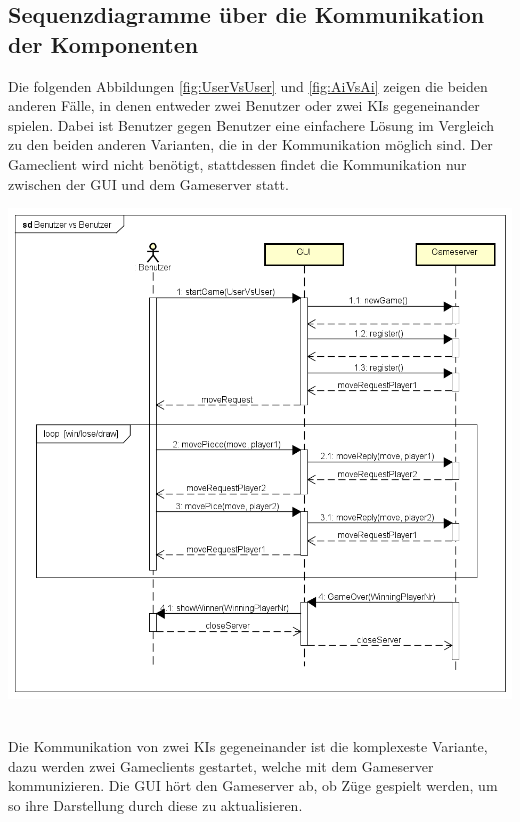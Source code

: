 \documentclass[12pt,a4paper,bibliography=totocnumbered,listof=totocnumbered]{article}
\begin{document}
\begin{appendix}
\pagebreak

\section{Sequenzdiagramme über die Kommunikation der Komponenten}
\label{apx:KommunikationDerKomp}
Die folgenden Abbildungen \ref{fig:UserVsUser} und \ref{fig:AiVsAi} zeigen die beiden anderen Fälle, in 
denen entweder zwei Benutzer oder zwei KIs gegeneinander spielen. Dabei ist Benutzer gegen Benutzer eine einfachere Lösung im Vergleich zu den beiden anderen Varianten, die 
in der Kommunikation möglich sind. Der Gameclient wird nicht benötigt, stattdessen findet die Kommunikation nur zwischen der \ac{GUI} und dem Gameserver statt.

\vspace{1em}
\begin{minipage}{\linewidth}
	\centering
	\includegraphics[width=1.0\linewidth]{pics/SequenceDiagramBenutzervsBenutzer.png}
    \label{fig:UserVsUser}
\end{minipage}
\\

Die Kommunikation von zwei KIs gegeneinander ist die komplexeste Variante, dazu werden zwei Gameclients gestartet, welche mit dem Gameserver 
kommunizieren. Die \ac{GUI} hört den Gameserver ab, ob Züge gespielt werden, um so ihre Darstellung durch diese zu aktualisieren.


\end{appendix}
\end{document}
